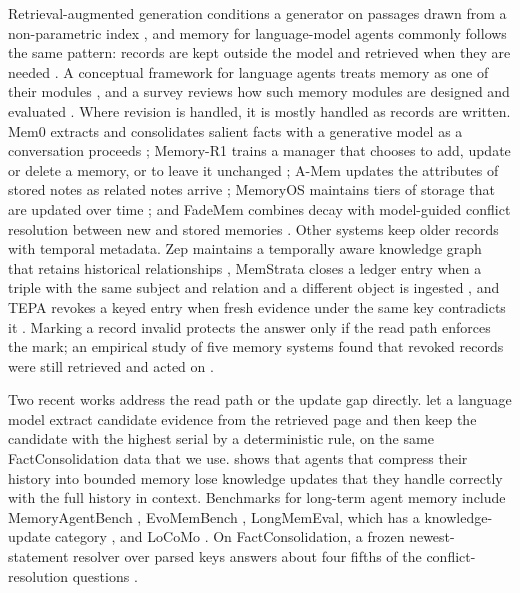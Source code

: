 \documentclass{CUP-JNL-NLP}
\begin{document}
Retrieval-augmented generation conditions a generator on passages drawn from a non-parametric index \citep{lewis2020retrieval}, and memory for language-model agents commonly follows the same pattern: records are kept outside the model and retrieved when they are needed \citep{packer2023memgpt,park2023generative}. A conceptual framework for language agents treats memory as one of their modules \citep{sumers2024cognitive}, and a survey reviews how such memory modules are designed and evaluated \citep{zhang2025survey}. Where revision is handled, it is mostly handled as records are written. Mem0 extracts and consolidates salient facts with a generative model as a conversation proceeds \citep{chhikara2025mem0}; Memory-R1 trains a manager that chooses to add, update or delete a memory, or to leave it unchanged \citep{yan2026memoryr1}; A-Mem updates the attributes of stored notes as related notes arrive \citep{xu2025amem}; MemoryOS maintains tiers of storage that are updated over time \citep{kang2025memoryos}; and FadeMem combines decay with model-guided conflict resolution between new and stored memories \citep{wei2026fademem}. Other systems keep older records with temporal metadata. Zep maintains a temporally aware knowledge graph that retains historical relationships \citep{rasmussen2025zep}, MemStrata closes a ledger entry when a triple with the same subject and relation and a different object is ingested \citep{yadav2026temporal}, and TEPA revokes a keyed entry when fresh evidence under the same key contradicts it \citep{zhou2026tepa}. Marking a record invalid protects the answer only if the read path enforces the mark; an empirical study of five memory systems found that revoked records were still retrieved and acted on \citep{shen2026revoked}.

Two recent works address the read path or the update gap directly. \citet{reddy2026reliable} let a language model extract candidate evidence from the retrieved page and then keep the candidate with the highest serial by a deterministic rule, on the same FactConsolidation data that we use. \citet{patel2026supersede} shows that agents that compress their history into bounded memory lose knowledge updates that they handle correctly with the full history in context. Benchmarks for long-term agent memory include MemoryAgentBench \citep{hu2026memoryagentbench}, EvoMemBench \citep{wang2026evomembench}, LongMemEval, which has a knowledge-update category \citep{wu2025longmemeval}, and LoCoMo \citep{maharana2024locomo}. On FactConsolidation, a frozen newest-statement resolver over parsed keys answers about four fifths of the conflict-resolution questions \citep{pakhomov2026bookkeeping}.
\end{document}
